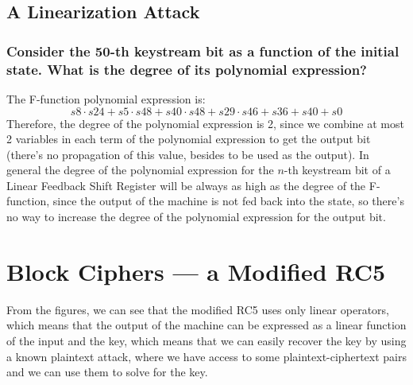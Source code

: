 \documentclass{article}
\begin{document}
\subsection{A Linearization Attack}
\subsubsection{Consider the 50-th keystream bit as a function of the initial state. What is the degree of its polynomial expression?}
The F-function polynomial expression is:
\begin{equation}
s8 \cdot s24 + s5 \cdot s48 + s40 \cdot s48 + s29 \cdot s46 + s36 + s40 + s0
\end{equation}
Therefore, the degree of the polynomial expression is 2, since we combine at most 2 variables in each term of the polynomial expression to get the output bit (there's no propagation of this value, besides to be used as the output).
In general the degree of the polynomial expression for the $n$-th keystream bit of a Linear Feedback Shift Register will be always as high as the degree of the F-function, since the output of the machine is not fed back into the state, so there's no way to increase the degree of the polynomial expression for the output bit.

\section{Block Ciphers --- a Modified RC5}
From the figures, we can see that the modified RC5 uses only linear operators, which means that the output of the machine can be expressed as a linear function of the input and the key, which means that we can easily recover the key by using a known plaintext attack, where we have access to some plaintext-ciphertext pairs and we can use them to solve for the key.
\end{document}
